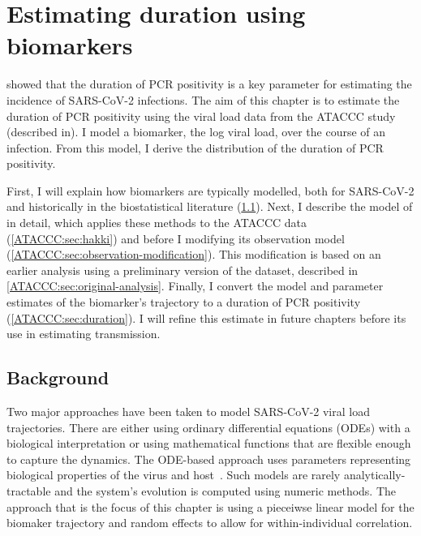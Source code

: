 \documentclass[thesis.tex]{subfiles}
\begin{document}
\ifSubfilesClassLoaded{
  \setcounter{chapter}{3}
}

\chapter{Estimating duration using biomarkers} \label{ATACCC}

 showed that the duration of PCR positivity is a key parameter for estimating the incidence of SARS-CoV-2 infections.
The aim of this chapter is to estimate the duration of PCR positivity using the viral load data from the ATACCC study (described in).
I model a biomarker, the log viral load, over the course of an infection.
From this model, I derive the distribution of the duration of PCR positivity.

First, I will explain how biomarkers are typically modelled, both for SARS-CoV-2 and historically in the biostatistical literature (\cref{ATACCC:sec:background}).
Next, I describe the model of \textcite{hakkiOnset} in detail, which applies these methods to the ATACCC data (\cref{ATACCC:sec:hakki}) and before I modifying its observation model (\cref{ATACCC:sec:observation-modification}).
This modification is based on an earlier analysis using a preliminary version of the dataset, described in \cref{ATACCC:sec:original-analysis}.
Finally, I convert the model and parameter estimates of the biomarker's trajectory to a duration of PCR positivity (\cref{ATACCC:sec:duration}).
I will refine this estimate in future chapters before its use in estimating transmission.

\section{Background} \label{ATACCC:sec:background}

Two major approaches have been taken to model SARS-CoV-2 viral load trajectories.
There are either using ordinary differential equations (ODEs) with a biological interpretation or using mathematical functions that are flexible enough to capture the dynamics.
The ODE-based approach uses parameters representing biological properties of the virus and host~\autocites[e.g.:][]{ejimaEstimation,keVivo,kimQuantitative,goncalvesTiming,perelsonMechanistic}.
Such models are rarely analytically-tractable and the system's evolution is computed using numeric methods.
The approach that is the focus of this chapter is using a pieceiwse linear model for the biomaker trajectory and random effects to allow for within-individual correlation.
\end{document}
